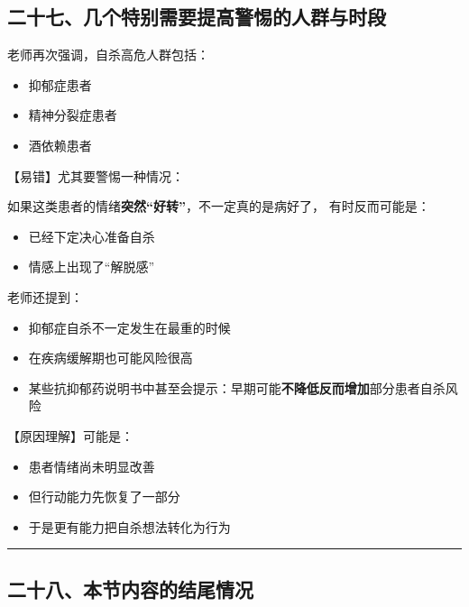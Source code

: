 \documentclass[
  chinese,
  9pt,
  a4paper,
]{ctexart}
\providecommand{\tightlist}{%
  \setlength{\itemsep}{0pt}\setlength{\parskip}{0pt}}
\begin{document}
\subsection{二十七、几个特别需要提高警惕的人群与时段}\label{ux4e8cux5341ux4e03ux51e0ux4e2aux7279ux522bux9700ux8981ux63d0ux9ad8ux8b66ux60d5ux7684ux4ebaux7fa4ux4e0eux65f6ux6bb5}

老师再次强调，自杀高危人群包括：

\begin{itemize}
\tightlist
\item
  抑郁症患者
\item
  精神分裂症患者
\item
  酒依赖患者
\end{itemize}

【易错】尤其要警惕一种情况：

如果这类患者的情绪\textbf{突然``好转''}，不一定真的是病好了，
有时反而可能是：

\begin{itemize}
\tightlist
\item
  已经下定决心准备自杀
\item
  情感上出现了``解脱感''
\end{itemize}

老师还提到：

\begin{itemize}
\tightlist
\item
  抑郁症自杀不一定发生在最重的时候
\item
  在疾病缓解期也可能风险很高
\item
  某些抗抑郁药说明书中甚至会提示：早期可能\textbf{不降低反而增加}部分患者自杀风险
\end{itemize}

【原因理解】可能是：

\begin{itemize}
\tightlist
\item
  患者情绪尚未明显改善
\item
  但行动能力先恢复了一部分
\item
  于是更有能力把自杀想法转化为行为
\end{itemize}

\begin{center}\rule{0.5\linewidth}{0.5pt}\end{center}

\subsection{二十八、本节内容的结尾情况}\label{ux4e8cux5341ux516bux672cux8282ux5185ux5bb9ux7684ux7ed3ux5c3eux60c5ux51b5}
\end{document}
